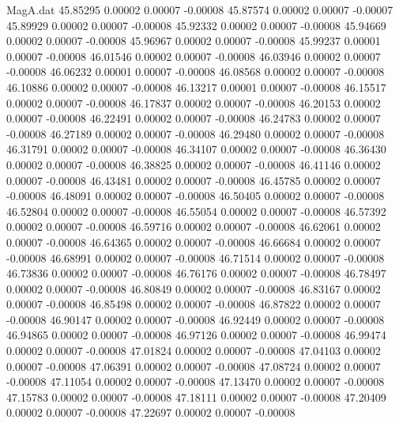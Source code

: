 \begin{filecontents}{MagA.dat}
  45.85295    0.00002    0.00007   -0.00008
  45.87574    0.00002    0.00007   -0.00007
  45.89929    0.00002    0.00007   -0.00008
  45.92332    0.00002    0.00007   -0.00008
  45.94669    0.00002    0.00007   -0.00008
  45.96967    0.00002    0.00007   -0.00008
  45.99237    0.00001    0.00007   -0.00008
  46.01546    0.00002    0.00007   -0.00008
  46.03946    0.00002    0.00007   -0.00008
  46.06232    0.00001    0.00007   -0.00008
  46.08568    0.00002    0.00007   -0.00008
  46.10886    0.00002    0.00007   -0.00008
  46.13217    0.00001    0.00007   -0.00008
  46.15517    0.00002    0.00007   -0.00008
  46.17837    0.00002    0.00007   -0.00008
  46.20153    0.00002    0.00007   -0.00008
  46.22491    0.00002    0.00007   -0.00008
  46.24783    0.00002    0.00007   -0.00008
  46.27189    0.00002    0.00007   -0.00008
  46.29480    0.00002    0.00007   -0.00008
  46.31791    0.00002    0.00007   -0.00008
  46.34107    0.00002    0.00007   -0.00008
  46.36430    0.00002    0.00007   -0.00008
  46.38825    0.00002    0.00007   -0.00008
  46.41146    0.00002    0.00007   -0.00008
  46.43481    0.00002    0.00007   -0.00008
  46.45785    0.00002    0.00007   -0.00008
  46.48091    0.00002    0.00007   -0.00008
  46.50405    0.00002    0.00007   -0.00008
  46.52804    0.00002    0.00007   -0.00008
  46.55054    0.00002    0.00007   -0.00008
  46.57392    0.00002    0.00007   -0.00008
  46.59716    0.00002    0.00007   -0.00008
  46.62061    0.00002    0.00007   -0.00008
  46.64365    0.00002    0.00007   -0.00008
  46.66684    0.00002    0.00007   -0.00008
  46.68991    0.00002    0.00007   -0.00008
  46.71514    0.00002    0.00007   -0.00008
  46.73836    0.00002    0.00007   -0.00008
  46.76176    0.00002    0.00007   -0.00008
  46.78497    0.00002    0.00007   -0.00008
  46.80849    0.00002    0.00007   -0.00008
  46.83167    0.00002    0.00007   -0.00008
  46.85498    0.00002    0.00007   -0.00008
  46.87822    0.00002    0.00007   -0.00008
  46.90147    0.00002    0.00007   -0.00008
  46.92449    0.00002    0.00007   -0.00008
  46.94865    0.00002    0.00007   -0.00008
  46.97126    0.00002    0.00007   -0.00008
  46.99474    0.00002    0.00007   -0.00008
  47.01824    0.00002    0.00007   -0.00008
  47.04103    0.00002    0.00007   -0.00008
  47.06391    0.00002    0.00007   -0.00008
  47.08724    0.00002    0.00007   -0.00008
  47.11054    0.00002    0.00007   -0.00008
  47.13470    0.00002    0.00007   -0.00008
  47.15783    0.00002    0.00007   -0.00008
  47.18111    0.00002    0.00007   -0.00008
  47.20409    0.00002    0.00007   -0.00008
  47.22697    0.00002    0.00007   -0.00008

\end{filecontents}
